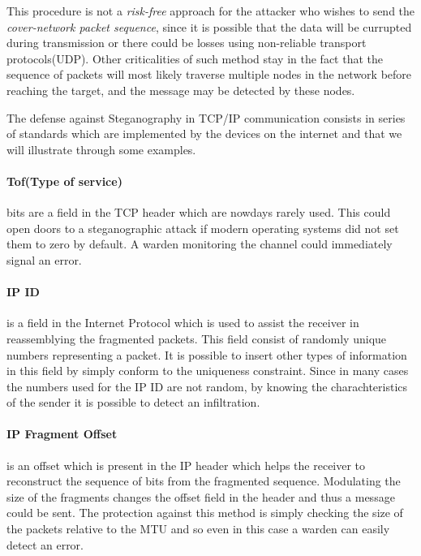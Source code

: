 \documentclass[../../main.tex]{subfiles}
\begin{document}
    This procedure is not a \emph{risk-free} approach for the attacker who
    wishes to send the \emph{cover-network packet sequence}, since it is
    possible that the data will be currupted during transmission or there could
    be losses using non-reliable transport protocols(UDP).
    Other criticalities of such method stay in the fact that the sequence of
    packets will most likely traverse multiple nodes in the network before
    reaching the target, and the message may be detected by these nodes.

    The defense against Steganography in TCP/IP communication consists in 
    series of standards which are implemented by the devices on the internet and
    that we will illustrate through some examples.


    \paragraph{Tof(Type of service)} bits are a field in the TCP header which
    are nowdays rarely used. This could open doors to a steganographic attack if
    modern operating systems did not set them to zero by default.
    A warden monitoring the channel could immediately signal an error.

    \paragraph{IP ID} is a field in the Internet Protocol which is used to
    assist the receiver in reassemblying the fragmented packets.
    This field consist of randomly unique numbers representing a packet.
    It is possible to insert other types of information in this field by simply
    conform to the uniqueness constraint.
    Since in many cases the numbers used for the IP ID are not random, by
    knowing the charachteristics of the sender it is possible to detect an
    infiltration.

    \paragraph{IP Fragment Offset} is an offset which is present in the IP
    header which helps the receiver to reconstruct the sequence of bits from the
    fragmented sequence.
    Modulating the size of the fragments changes the offset field in the header
    and thus a message could be sent.
    The protection against this method is simply checking the size of the
    packets relative to the MTU and so even in this case a warden can easily
    detect an error.
\end{document}
